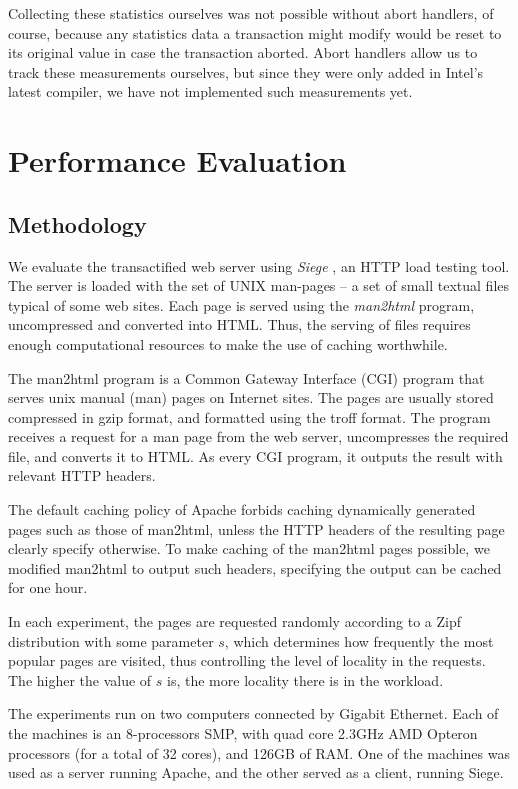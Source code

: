 \documentclass[11pt]{sigplanconf}
\let \cite = \citep
\begin{document}
Collecting these statistics ourselves was not possible without abort handlers,
of course, because any statistics data a transaction might modify would be
reset to its original value in case the transaction aborted. Abort handlers
allow us to track these measurements ourselves, but since they were only
added in Intel's latest compiler, we have not implemented such measurements yet.

\section{Performance Evaluation}\label{sec:evaluation}
\subsection{Methodology} 

We evaluate the transactified web server  using \emph{Siege} \cite{siege}, an
HTTP load testing tool. The server is loaded with the set of UNIX man-pages -- a
set of small textual files typical of some web sites. Each page is served using
the \emph{man2html} program, uncompressed and converted into HTML.
Thus,  
the serving of files requires enough computational resources to make the use of
caching worthwhile.

The man2html program is a Common Gateway Interface (CGI) program that serves
unix manual (man) pages on Internet sites. The pages are usually stored
compressed in gzip format, and formatted using the troff format. The program
receives a request for a man page from the web server, uncompresses the required
file, and converts it to HTML. As every CGI program, it outputs the result with
relevant HTTP headers.

The default caching policy of Apache forbids caching dynamically generated pages
such as those of man2html, unless the HTTP headers of the resulting page clearly
specify otherwise. To make caching of the man2html pages possible, we modified
man2html to output such headers, specifying the output can be cached for one
hour.

In each experiment, the pages are requested randomly according to a Zipf 
distribution with some parameter $s$, which
determines how frequently the most popular pages are visited,
thus controlling the level of locality in the requests.
The higher the value of $s$ is, the more locality there is in the 
workload.

The experiments run on two computers connected by  Gigabit Ethernet.
Each of the machines is an 8-processors SMP, with quad core 2.3GHz AMD Opteron
processors (for a total of 32 cores), and 126GB of RAM. One of the machines was
used as a server running Apache, and the other served as a client, running
Siege.
\end{document}
